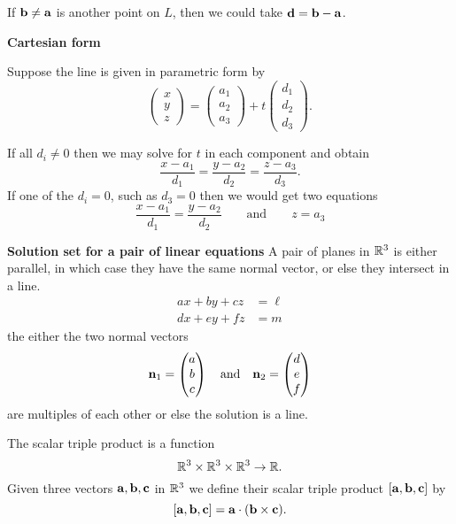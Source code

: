 \documentclass[10pt, a4paper]{article}
\begin{document}
If $\mathbf{b \neq a}$ is another point on $L$, then we could take $\mathbf{d = b - a}$.

\textbf{Cartesian form}

Suppose the line is given in parametric form by
\[
\begin{pmatrix}
    x \\ y \\ z
\end{pmatrix}
=
\begin{pmatrix}
    a_1 \\ a_2 \\ a_3
\end{pmatrix}
+
t\begin{pmatrix}
    d_1 \\ d_2 \\ d_3
\end{pmatrix}.
\]

If all $d_i \neq 0$ then we may solve for $t$ in each component and obtain
\[
\frac{x - a_1}{d_1} = \frac{y - a_2}{d_2} = \frac{z - a_3}{d_3}.
\]
If one of the $d_i = 0$, such as $d_3 = 0$ then we would get two equations
\[
\frac{x - a_1}{d_1} = \frac{y - a_2}{d_2}\qquad\text{and}\qquad z = a_3
\]

\textbf{Solution set for a pair of linear equations}
A pair of planes in $\mathbb{R} ^ 3$ is either parallel, in which case they have the same normal vector, or else they intersect in a line.
\begin{align*}
    ax + by + cz &= \ell \\
    dx + ey + fz &= m
\end{align*}
the either the two normal vectors
\[
\mathbf{n}_1 = \begin{pmatrix} a \\ b \\ c \end{pmatrix}\quad\text{and}\quad\mathbf{n}_2 = \begin{pmatrix} d \\ e \\ f \end{pmatrix}
\]
are multiples of each other or else the solution is a line.

\begin{definition}
    The scalar triple product is a function
    \[
    \mathbb{R} ^ 3 \times \mathbb{R} ^ 3 \times \mathbb{R} ^ 3 \rightarrow \mathbb{R}.
    \]
    Given three vectors $\mathbf{a, b, c}$ in $\mathbb{R} ^ 3$ we define their scalar triple product $[\mathbf{a, b, c}]$ by
    \[
    [\mathbf{a, b, c}] = \mathbf{a} \cdot(\mathbf{b} \times \mathbf{c}).
    \]
\end{definition}
\end{document}
